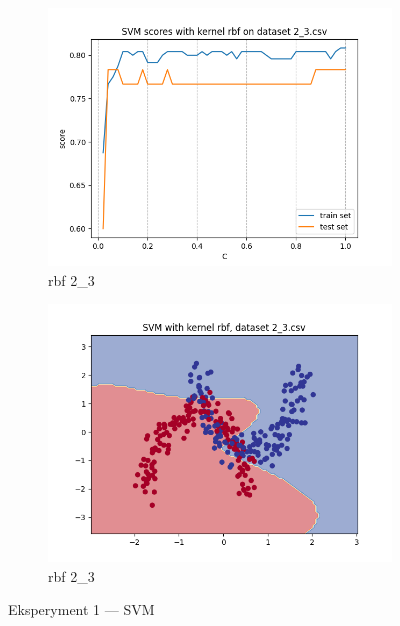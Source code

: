 \documentclass[12pt]{article}
\newcommand*{\subfigwidth}{0.24\textwidth}
\begin{document}
\begin{figure}[H]
\begin{subfigure}[t]{\subfigwidth}
        \includegraphics[width=\linewidth]{img/exp_1/svm/2_3/rbf/scores.png}
        \caption{rbf 2\_3}
    \end{subfigure}
    \hfill
    \begin{subfigure}[t]{\subfigwidth}
        \includegraphics[width=\linewidth]{img/exp_1/svm/2_3/rbf/boundary.png}
        \caption{rbf 2\_3}
    \end{subfigure}
    \caption{Eksperyment 1 --- SVM}\label{fig:figure17}
\end{figure}

\clearpage
\end{document}
